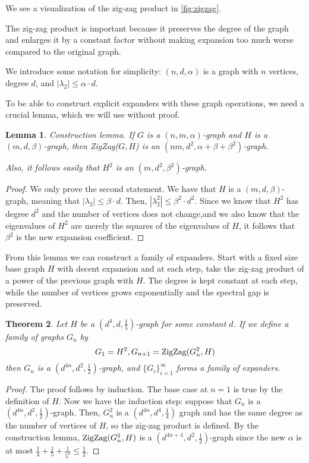 \documentclass[11pt]{article}
\newtheorem{theorem}{Theorem}[section]
\newtheorem{lemma}[theorem]{Lemma}
\theoremstyle{definition}
\theoremstyle{definition}
\theoremstyle{definition}
\newcommand{\txt}[1]
{\textnormal{#1}}
\newcommand{\zigzag}
{ZigZag($G, H$)}
\begin{document}
We see a visualization of the zig-zag product in \autoref{fig:zigzag}.

The zig-zag product is important because it preserves the degree of the graph and enlarges it by a constant factor without making expansion too much worse compared to the original graph. 

We introduce some notation for simplicity: $(n, d, \alpha)$ is a graph with $n$ vertices, degree $d$, and $|\lambda_2| \leq \alpha \cdot d$. 

To be able to construct explicit expanders with these graph operations, we need a crucial lemma, which we will use without proof. 

\begin{lemma} Construction lemma. 
If $G$ is a $(n, m, \alpha)$-graph and $H$ is a $(m, d, \beta)$-graph, then \zigzag
is an $(nm, d^2, \alpha + \beta + \beta^2)$-graph.

Also, it follows easily that $H^2$ is an $(m, d^2, \beta^2)$-graph.
\end{lemma}

\begin{proof}
We only prove the second statement. 
We have that $H$ is a $(m, d, \beta)$-graph, meaning that $|\lambda_2| \leq \beta \cdot d$. 
Then, $|\lambda_2^2| \leq \beta^2 \cdot d^2$. Since we know that $H^2$ has degree $d^2$ and the number
of vertices does not change,and we also know that the eigenvalues of $H^2$ are merely the squares of the eigenvalues of $H$, it follows that $\beta^2$ is the new expansion coefficient. 
\end{proof}

From this lemma we can construct a family of expanders. Start with a fixed size base graph $H$ with decent expansion and at each step, take the zig-zag product of a power of the previous graph with $H$. The degree is kept constant at each step, while the number of vertices grows exponentially and the spectral gap is preserved. 

\begin{theorem} Let $H$ be a $(d^4, d, \frac{1}{5})$-graph for some constant $d$. If we define a family of graphs $G_n$ by 
\[
G_1 = H^2, G_{n + 1} = \txt{ZigZag}(G_n^2, H)
\]
then $G_{n}$ is a $(d^{4n}, d^2, \frac{1}{2})$-graph, and $\{G_i\}_{i = 1}^{\infty}$ forms a family of expanders. 
\end{theorem}

\begin{proof}
The proof follows by induction. The base case at $n = 1$ is true by the definition of $H$. 
Now we have the induction step: suppose that $G_n$ is a $(d^{4n}, d^2, \frac{1}{2})$-graph. Then, $G_n^2$ is a $(d^{4n}, d^4, \frac{1}{4})$ graph and has the same degree as the number of vertices of $H$, so the zig-zag product is defined. By the construction lemma, $\txt{ZigZag}(G_n^2, H)$ is a $(d^{4n + 4}, d^2, \frac{1}{2})$-graph since the new $\alpha$ is at most $\frac{1}{4} + \frac{1}{5} + \frac{1}{5^2} \leq \frac{1}{2}$.\end{proof}
\end{document}
